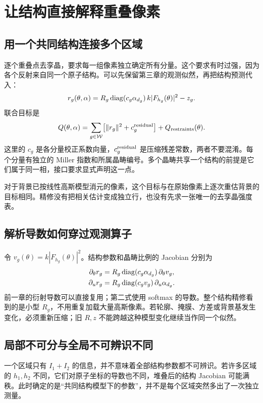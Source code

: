 \chapter{让结构直接解释重叠像素}
\section{用一个共同结构连接多个区域}
逐个重叠点去孪晶，要求每一组像素独立确定所有分量。这个要求有时过强，因为各个反射来自同一个原子结构。可以先保留第三章的观测似然，再把结构预测代入：
\begin{equation}\label{eq:joint-residual}
 r_g(\theta,\alpha)=R_g\operatorname{diag}(c_g\alpha_{d_g})\,k|F_{h_g}(\theta)|^2-z_g.
\end{equation}
联合目标是
\begin{equation}
 Q(\theta,\alpha)=\sum_{g\in\mathcal W}\bigl[\|r_g\|^2+c_g^{\rm residual}\bigr]
                  +Q_{\rm restraints}(\theta).
\end{equation}
这里的 $c_g$ 是各分量校正系数向量，$c_g^{\rm residual}$ 是压缩残差常数，两者不要混淆。每个分量有独立的 Miller 指数和所属晶畴编号。多个晶畴共享一个结构的前提是它们属于同一相，接口要求显式声明这一点。

对于背景已按线性高斯模型消元的像素，这个目标与在原始像素上逐次重估背景的目标相同。精修没有把相关估计变成独立行，也没有先求一张唯一的去孪晶强度表。

\section{解析导数如何穿过观测算子}
令 $v_g(\theta)=k|F_{h_g}(\theta)|^2$。结构参数和晶畴比例的 Jacobian 分别为
\begin{align}
 \partial_\theta r_g&=R_g\operatorname{diag}(c_g\alpha_{d_g})\,\partial_\theta v_g,\\
 \partial_u r_g&=R_g\operatorname{diag}(c_gv_g)\,\partial_u\alpha_{d_g}.
\end{align}
前一章的衍射导数可以直接复用；第二式使用 softmax 的导数。整个结构精修看到的是小型 $R_g$，不用重复加载大量高斯像素。若轮廓、掩膜、方差或背景基发生变化，必须重新压缩；旧 $R,z$ 不能跨越这种模型变化继续当作同一个似然。

\section{局部不可分与全局不可辨识不同}
一个区域只有 $I_1+I_2$ 的信息，并不意味着全部结构参数都不可辨识。若许多区域的 $h_1,h_2$ 不同，它们对原子坐标的导数也不同，堆叠后的结构 Jacobian 可能满秩。此时确定的是“共同结构模型下的参数”，并不是每个区域突然多出了一次独立测量。

